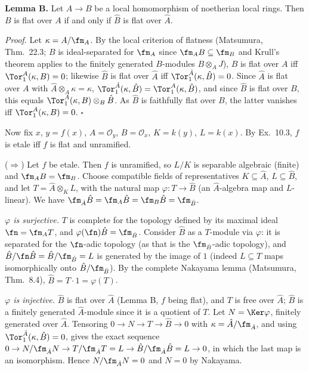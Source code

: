 \documentclass[11pt]{article}
\begin{document}
\textbf{Lemma B.} Let $A\to B$ be a local homomorphism of noetherian local rings. Then $B$ is flat over $A$ if and only if $\hat B$ is flat over $\hat A$.

\emph{Proof.} Let $\kappa=A/\fm_A$. By the local criterion of flatness (Matsumura, Thm.~22.3; $B$ is ideal-separated for $\fm_A$ since $\fm_AB\subseteq\fm_B$ and Krull's theorem applies to the finitely generated $B$-modules $B\otimes_AJ$), $B$ is flat over $A$ iff $\Tor_1^A(\kappa,B)=0$; likewise $\hat B$ is flat over $\hat A$ iff $\Tor_1^{\hat A}(\kappa,\hat B)=0$. Since $\hat A$ is flat over $A$ with $\hat A\otimes_A\kappa=\kappa$, $\Tor_1^{\hat A}(\kappa,\hat B)=\Tor_1^A(\kappa,\hat B)$, and since $\hat B$ is flat over $B$, this equals $\Tor_1^A(\kappa,B)\otimes_B\hat B$. As $\hat B$ is faithfully flat over $B$, the latter vanishes iff $\Tor_1^A(\kappa,B)=0$. $\square$

Now fix $x$, $y=f(x)$, $A=\mathcal O_y$, $B=\mathcal O_x$, $K=k(y)$, $L=k(x)$. By Ex.~10.3, $f$ is etale iff $f$ is flat and unramified.

($\Rightarrow$) Let $f$ be etale. Then $f$ is unramified, so $L/K$ is separable algebraic (finite) and $\fm_AB=\fm_B$. Choose compatible fields of representatives $K\subseteq\hat A$, $L\subseteq\hat B$, and let $T=\hat A\otimes_KL$, with the natural map $\varphi:T\to\hat B$ (an $\hat A$-algebra map and $L$-linear). We have $\fm_{\hat A}\hat B=\fm_A\hat B=\fm_B\hat B=\fm_{\hat B}$.

\emph{$\varphi$ is surjective.} $T$ is complete for the topology defined by its maximal ideal $\fn=\fm_AT$, and $\varphi(\fn)\hat B=\fm_{\hat B}$. Consider $\hat B$ as a $T$-module via $\varphi$: it is separated for the $\fn$-adic topology (as that is the $\fm_{\hat B}$-adic topology), and $\hat B/\fn\hat B=\hat B/\fm_{\hat B}=L$ is generated by the image of $1$ (indeed $L\subseteq T$ maps isomorphically onto $\hat B/\fm_{\hat B}$). By the complete Nakayama lemma (Matsumura, Thm.~8.4), $\hat B=T\cdot1=\varphi(T)$.

\emph{$\varphi$ is injective.} $\hat B$ is flat over $\hat A$ (Lemma B, $f$ being flat), and $T$ is free over $\hat A$; $\hat B$ is a finitely generated $\hat A$-module since it is a quotient of $T$. Let $N=\Ker\varphi$, finitely generated over $\hat A$. Tensoring $0\to N\to T\to\hat B\to0$ with $\kappa=\hat A/\fm_{\hat A}$, and using $\Tor_1^{\hat A}(\kappa,\hat B)=0$, gives the exact sequence $0\to N/\fm_{\hat A}N\to T/\fm_{\hat A}T=L\to\hat B/\fm_{\hat A}\hat B=L\to0$, in which the last map is an isomorphism. Hence $N/\fm_{\hat A}N=0$ and $N=0$ by Nakayama.
\end{document}
